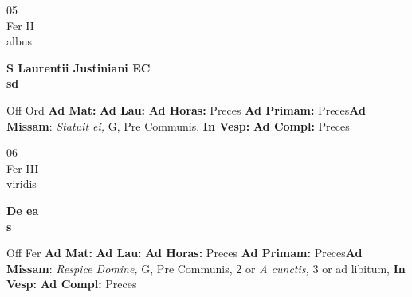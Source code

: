 \documentclass[10pt, openany]{book}
\begin{document}
    \begin{center}
        \begin{minipage}{3.5in}
            \vspace{2em}
            \begin{minipage}{0.5in}
                {\Huge 05} \\
                {\normalsize Fer II} \\
                {\normalsize albus}
            \end{minipage}
            \begin{minipage}{3.0in}
                \textbf{ \large S Laurentii Justiniani EC \\
                \textnormal{\normalsize sd}} \\ 
            \end{minipage}
            \begin{justify}Off Ord
                \textbf{Ad Mat: }
                \textbf{Ad Lau: }
                \textbf{Ad Horas: }Preces
                \textbf{Ad Primam: }Preces\textbf{Ad Missam}: \textit{Statuit ei,} G, Pre Communis,  
                \textbf{In Vesp: }
                \textbf{Ad Compl: }Preces
            \end{justify}
        \end{minipage}
    \end{center}

    \begin{center}
        \begin{minipage}{3.5in}
            \vspace{2em}
            \begin{minipage}{0.5in}
                {\Huge 06} \\
                {\normalsize Fer III} \\
                {\normalsize viridis}
            \end{minipage}
            \begin{minipage}{3.0in}
                \textbf{ \large De ea \\
                \textnormal{\normalsize s}} \\ 
            \end{minipage}
            \begin{justify}Off Fer
                \textbf{Ad Mat: }
                \textbf{Ad Lau: }
                \textbf{Ad Horas: }Preces
                \textbf{Ad Primam: }Preces\textbf{Ad Missam}: \textit{Respice Domine,} G, Pre Communis, 2 or \textit{A cunctis,} 3 or ad libitum,  
                \textbf{In Vesp: }
                \textbf{Ad Compl: }Preces
            \end{justify}
        \end{minipage}
    \end{center}
\end{document}
